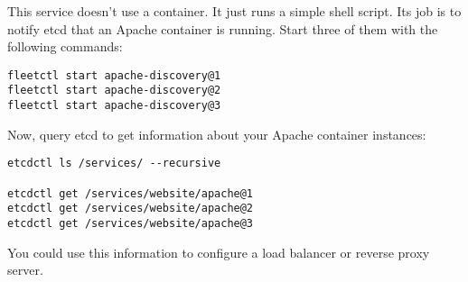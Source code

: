\documentclass{article}
\begin{document}
This service doesn't use a container.  It just runs a simple shell script.  Its job is to notify etcd that an Apache container is running.  Start three of them with the following commands:

\begin{verbatim}
fleetctl start apache-discovery@1
fleetctl start apache-discovery@2
fleetctl start apache-discovery@3
\end{verbatim}

Now, query etcd to get information about your Apache container instances:

\begin{verbatim}
etcdctl ls /services/ --recursive

etcdctl get /services/website/apache@1
etcdctl get /services/website/apache@2
etcdctl get /services/website/apache@3
\end{verbatim}

You could use this information to configure a load balancer or reverse proxy server.
\end{document}
